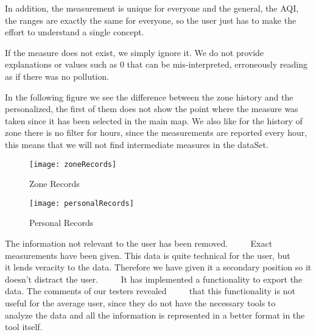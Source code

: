 In addition, the measurement is unique for everyone and the general, the AQI, the ranges are exactly the same for everyone, so the user just has to make the effort to understand a single concept.

If the measure does not exist, we simply ignore it. We do not provide explanations or values such as 0 that can be mis-interpreted, erroneously reading as if there was no pollution.


In the following figure we see the difference between the zone history and the personalized, the first of them does not show
the point where the measure was taken since it has been selected in the main map. We also like for the history of
zone there is no filter for hours, since the measurements are reported every hour, this means that we will not find
intermediate measures in the dataSet.
 
\begin{figure}[ht]
    \centering
    \texttt{[image: zoneRecords]}
    \caption{Zone Records}
\end{figure}
\begin{figure}[ht]
    \centering
    \texttt{[image: personalRecords]}
    \caption{Personal Records}
\end{figure}


\begin{itemize}
    \done The information not relevant to the user has been removed.
         \crossed Exact measurements have been given. This data is quite technical for the user, but 
         it lends veracity to the data. Therefore we have given it a secondary position so it doesn't distract the user.
         \crossed It has implemented a functionality to export the data. The comments of our testers revealed
         that this functionality is not useful for the average user, since they do not have the necessary tools to
         analyze the data and all the information is represented in a better format in the tool itself.
    
\end{itemize}
 \newpage
